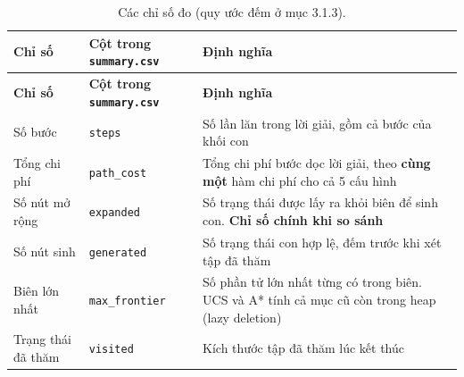 \begin{longtable}[]{@{}
  >{\raggedright\arraybackslash}p{}
  >{\raggedright\arraybackslash}p{}
  >{\raggedright\arraybackslash}p{}@{}}
\caption{ Các chỉ số đo (quy ước đếm ở mục 3.1.3).}\tabularnewline
\toprule\noalign{}
\rowcolor{tablehead}\begin{minipage}[b]{\linewidth}\raggedright
\textbf{Chỉ số}
\end{minipage} & \begin{minipage}[b]{\linewidth}\raggedright
\textbf{Cột trong \texttt{summary.\allowbreak{}csv}}
\end{minipage} & \begin{minipage}[b]{\linewidth}\raggedright
\textbf{Định nghĩa}
\end{minipage} \\
\midrule\noalign{}
\endfirsthead
\toprule\noalign{}
\rowcolor{tablehead}\begin{minipage}[b]{\linewidth}\raggedright
\textbf{Chỉ số}
\end{minipage} & \begin{minipage}[b]{\linewidth}\raggedright
\textbf{Cột trong \texttt{summary.\allowbreak{}csv}}
\end{minipage} & \begin{minipage}[b]{\linewidth}\raggedright
\textbf{Định nghĩa}
\end{minipage} \\
\midrule\noalign{}
\endhead
\bottomrule\noalign{}
\endlastfoot
Số bước & \texttt{steps} & Số lần lăn trong lời giải, gồm cả bước của khối con \\
\rowrule
Tổng chi phí & \texttt{path\_\allowbreak{}cost} & Tổng chi phí bước dọc lời giải, theo \textbf{cùng một} hàm chi phí cho cả 5 cấu hình \\
\rowrule
Số nút mở rộng & \texttt{expanded} & Số trạng thái được lấy ra khỏi biên để sinh con. \textbf{Chỉ số chính khi so sánh} \\
\rowrule
Số nút sinh & \texttt{generated} & Số trạng thái con hợp lệ, đếm trước khi xét tập đã thăm \\
\rowrule
Biên lớn nhất & \texttt{max\_\allowbreak{}frontier} & Số phần tử lớn nhất từng có trong biên. UCS và A* tính cả mục cũ còn trong heap (lazy deletion) \\
\rowrule
Trạng thái đã thăm & \texttt{visited} & Kích thước tập đã thăm lúc kết thúc \\

\end{longtable}
